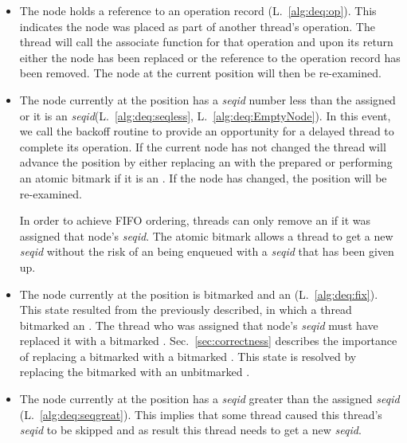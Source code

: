 \begin{itemize}
\item The node holds a reference to an operation record (L.~\ref{alg:deq:op}).
This indicates the node was placed as part of another thread's operation.
The thread will call the associate function for that operation and upon its return either the node has been replaced or the reference to the operation record has been removed.
The node at the current position will then be re-examined.

\item The node currently at the position has a \emph{seqid} number less than the assigned or it is an  \emph{seqid}(L.~\ref{alg:deq:seqless}, L.~\ref{alg:deq:EmptyNode}).
In this event, we call the backoff routine to provide an opportunity for a delayed thread to complete its operation.
If the current node has not changed the thread will advance the position by either replacing an  with the prepared  or performing an atomic bitmark if it is an .
If the node has changed, the position will be re-examined.

In order to achieve FIFO ordering, threads can only remove an  if it was assigned that node's \emph{seqid}.
The atomic bitmark allows a thread to get a new \emph{seqid} without the risk of an  being enqueued with a \emph{seqid} that has been given up. %

\item The node currently at the position is bitmarked and an  (L.~\ref{alg:deq:fix}).
This state resulted from the previously described, in which a thread bitmarked an .
The thread who was assigned that node's \emph{seqid} must have replaced it with a bitmarked .
Sec.~\ref{sec:correctness} describes the importance of replacing a bitmarked  with a bitmarked .
This state is resolved by replacing  the bitmarked  with  an unbitmarked .

\item The node currently at the position has a \emph{seqid} greater than the assigned \emph{seqid} (L.~\ref{alg:deq:seqgreat}).
This implies that some thread caused this thread's \emph{seqid} to be skipped and as result this thread needs to get a new \emph{seqid}.

\end{itemize}

